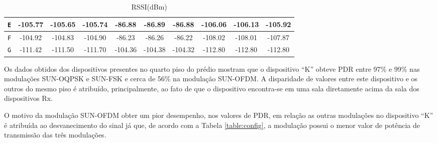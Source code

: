 \begin{table}
\begin{subtable}{\textwidth}
\begin{center}
\begin{tabular}{|c|c|c|c|c|c|c|c|c|c|}
                        \texttt{E} & -105.77                               & -105.65                                 & -105.74                                & -86.88         & -86.89         & -86.88         & -106.06        & -106.13        & -105.92        \\ \hline
                        \texttt{F} & -104.92                               & -104.83                                 & -104.90                                & -86.23         & -86.26         & -86.22         & -108.02        & -108.01        & -107.87        \\ \hline
                        \texttt{G} & -111.42                               & -111.50                                 & -111.70                                & -104.36        & -104.38        & -104.32        & -112.80        & -112.80        & -112.80        \\ \hline
                  \end{tabular}
                  \caption{RSSI(dBm)}
                  \label{table:rssi3}
            \end{center}
      \end{subtable}%
      \label{tab:table1}
\end{table}

Os dados obtidos dos dispositivos presentes no quarto piso do prédio mostram que o dispositivo ``K'' obteve PDR entre 97\% e 99\% nas modulações SUN-OQPSK e SUN-FSK e cerca de 56\% na modulação SUN-OFDM. A disparidade de valores entre este dispositivo e os outros do mesmo piso é atribuído, principalmente, ao fato de que o dispositivo encontra-se em uma sala diretamente acima da sala dos dispositivos Rx.

O motivo da modulação SUN-OFDM obter um pior desempenho, nos valores de PDR, em relação as outras modulações no dispositivo ``K'' é atribuída ao desvanecimento do sinal já que, de acordo com a Tabela \ref{table:config}, a modulação possui o menor valor de potência de transmissão das três modulações.

